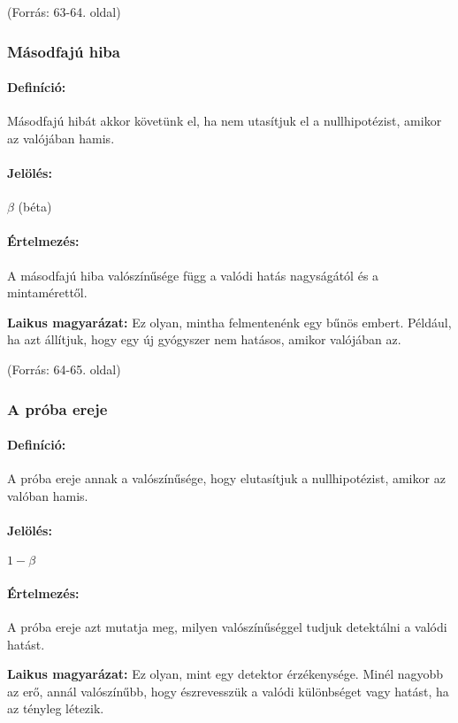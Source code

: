 \documentclass[a4paper,12pt]{article}
\begin{document}
    (Forrás: 63-64. oldal)

    \subsubsection{Másodfajú hiba}

    \paragraph{Definíció:}
    Másodfajú hibát akkor követünk el, ha nem utasítjuk el a nullhipotézist, amikor az valójában hamis.

    \paragraph{Jelölés:} $\beta$ (béta)

    \paragraph{Értelmezés:}
    A másodfajú hiba valószínűsége függ a valódi hatás nagyságától és a mintamérettől.

    \textbf{Laikus magyarázat:}
    Ez olyan, mintha felmentenénk egy bűnös embert. Például, ha azt állítjuk, hogy egy új gyógyszer nem hatásos, amikor valójában az.

    (Forrás: 64-65. oldal)

    \subsubsection{A próba ereje}

    \paragraph{Definíció:}
    A próba ereje annak a valószínűsége, hogy elutasítjuk a nullhipotézist, amikor az valóban hamis.

    \paragraph{Jelölés:} $1 - \beta$

    \paragraph{Értelmezés:}
    A próba ereje azt mutatja meg, milyen valószínűséggel tudjuk detektálni a valódi hatást.

    \textbf{Laikus magyarázat:}
    Ez olyan, mint egy detektor érzékenysége. Minél nagyobb az erő, annál valószínűbb, hogy észrevesszük a valódi különbséget vagy hatást, ha az tényleg létezik.
\end{document}
